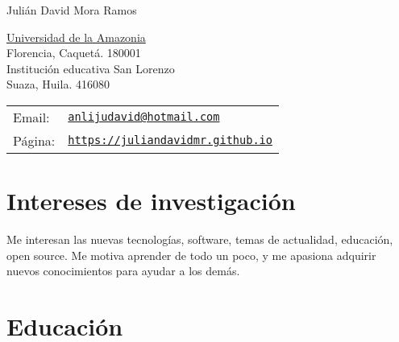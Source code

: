 \documentclass[letterpaper]{article}
\def\name{Juli\'an David Mora Ramos}
\renewenvironment{itemize}{
  \begin{list}{}{
    \setlength{\leftmargin}{1.5em}
  }
}{
  \end{list}
}
\begin{document}
{\huge \name}


\vspace{0.25in}

\begin{minipage}{0.45\linewidth}
	\href{http://www.udla.edu.co}{Universidad de la Amazonia} \\
	Florencia, Caquet\'a. 180001\\
	Instituci\'on educativa San Lorenzo \\
	Suaza, Huila. 416080 \\
 
\end{minipage}
\begin{minipage}{0.45\linewidth}
  \begin{tabular}{ll}
    Email: & \href{mailto:anlijudavid@hotmail.com}{\tt anlijudavid@hotmail.com} \\
    P\'agina: & \href{https://juliandavidmr.github.io}{\tt https://juliandavidmr.github.io} \\
  \end{tabular}
\end{minipage}

\section*{Intereses de investigaci\'on}
\begin{itemize}
\item Me interesan las nuevas tecnolog\'ias, software, temas de actualidad, educaci\'on, open source. Me motiva aprender de todo un poco, y me apasiona adquirir nuevos conocimientos para ayudar a los dem\'as.
\end{itemize} 

\section*{Educaci\'on}
\end{document}
